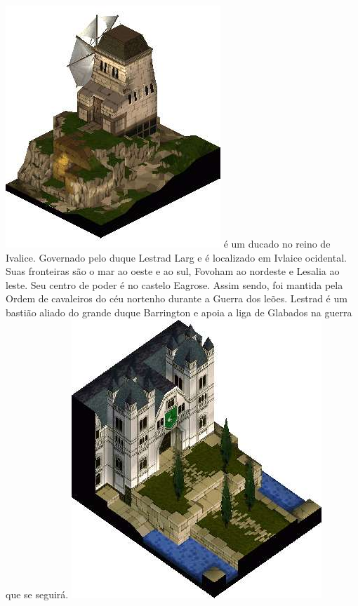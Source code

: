 \includegraphics[width=\columnwidth]{./art/worldbook/fovohamplains.jpg}
\newpage
%
 é um ducado no reino de Ivalice.
Governado pelo duque Lestrad Larg e é localizado em Ivlaice ocidental.
Suas fronteiras são o mar ao oeste e ao sul, Fovoham ao nordeste e Lesalia ao leste. Seu centro de poder é no castelo Eagrose.
Assim sendo, foi mantida pela Ordem de cavaleiros do céu nortenho durante a Guerra dos leões.
Lestrad é um bastião aliado do grande duque Barrington e apoia a liga de Glabados na guerra que se seguirá.
%
\vfill
\includegraphics[width=\columnwidth]{./art/worldbook/belouveresidence.jpg}
